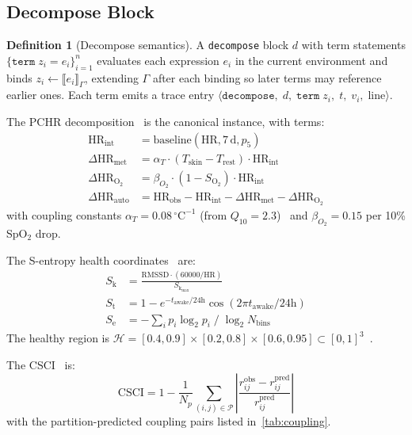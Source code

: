 \documentclass[10pt,twocolumn,a4paper]{article}
\theoremstyle{definition}
\newtheorem{definition}[theorem]{Definition}
\theoremstyle{remark}
\newcommand{\HR}{\mathrm{HR}}
\newcommand{\SE}{S_{\mathrm{e}}}
\newcommand{\SK}{S_{\mathrm{k}}}
\newcommand{\ST}{S_{\mathrm{t}}}
\newcommand{\CSCI}{\mathrm{CSCI}}
\newcommand{\Soxy}{S_{\mathrm{O_2}}}
\begin{document}
\subsection{Decompose Block}

\begin{definition}[Decompose semantics]
\label{def:decompose}
A \texttt{decompose} block $d$ with term statements
$\{\texttt{term}\; z_i = e_i\}_{i=1}^{n}$ evaluates each expression
$e_i$ in the current environment and binds $z_i \leftarrow \llbracket e_i
\rrbracket_\Gamma$, extending $\Gamma$ after each binding so later terms
may reference earlier ones.  Each term emits a trace entry
$\langle\texttt{decompose},\;d,\;\texttt{term}\;z_i,\;t,\;v_i,\;\mathrm{line}\rangle$.
\end{definition}

The PCHR decomposition~\cite{sachikonye2024disambiguation} is the
canonical instance, with terms:
\begin{align}
\HR_{\mathrm{int}} &= \mathrm{baseline}(\HR, 7\,\mathrm{d}, p_5)
\label{eq:hr_int} \\
\Delta\HR_{\mathrm{met}} &= \alpha_T \cdot (T_{\mathrm{skin}} - T_{\mathrm{rest}}) \cdot \HR_{\mathrm{int}}
\label{eq:dhr_met} \\
\Delta\HR_{\mathrm{O}_2} &= \beta_{O_2} \cdot (1 - \Soxy) \cdot \HR_{\mathrm{int}}
\label{eq:dhr_o2} \\
\Delta\HR_{\mathrm{auto}} &= \HR_{\mathrm{obs}} - \HR_{\mathrm{int}} - \Delta\HR_{\mathrm{met}} - \Delta\HR_{\mathrm{O}_2}
\label{eq:dhr_auto}
\end{align}
with coupling constants $\alpha_T = 0.08\,{}^{\circ}\mathrm{C}^{-1}$ (from
$Q_{10}=2.3$)~\cite{sachikonye2024disambiguation,sachikonye2024optical}
and $\beta_{O_2} = 0.15$ per 10\% SpO$_2$ drop.

The S-entropy health coordinates~\cite{sachikonye2024disambiguation} are:
\begin{align}
\SK &= \frac{\mathrm{RMSSD} \cdot (60000/\HR)}{\SK_{\max}}
\label{eq:sk} \\
\ST &= 1 - e^{-t_{\mathrm{awake}}/24\mathrm{h}} \cos(2\pi t_{\mathrm{awake}}/24\mathrm{h})
\label{eq:st} \\
\SE &= -\sum_i p_i \log_2 p_i \;/\; \log_2 N_{\mathrm{bins}}
\label{eq:se}
\end{align}
The healthy region is $\mathcal{H} = [0.4,0.9]\times[0.2,0.8]\times[0.6,0.95]
\subset [0,1]^3$~\cite{sachikonye2024disambiguation}.

The CSCI~\cite{sachikonye2024disambiguation} is:
\begin{equation}
\CSCI = 1 - \frac{1}{N_p}\sum_{(i,j)\in\mathcal{P}}
\left|\frac{r_{ij}^{\mathrm{obs}} - r_{ij}^{\mathrm{pred}}}{r_{ij}^{\mathrm{pred}}}\right|
\label{eq:csci}
\end{equation}
with the partition-predicted coupling pairs listed in~\cref{tab:coupling}.
\end{document}

